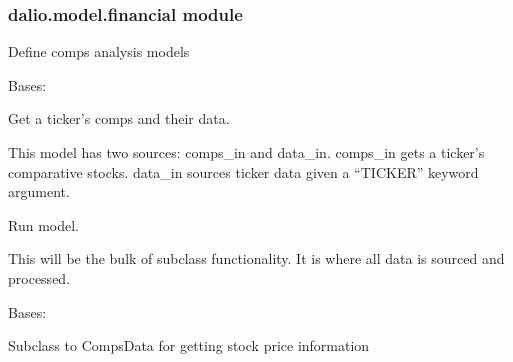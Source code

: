 \documentclass[letterpaper,10pt,english]{sphinxmanual}
\begin{document}
\subsubsection{dalio.model.financial module}
\label{\detokenize{dalio.model:module-dalio.model.financial}}\label{\detokenize{dalio.model:dalio-model-financial-module}}
Define comps analysis models

\begin{fulllineitems}
\label{\detokenize{dalio.model:dalio.model.financial.CompsData}}
Bases: {\hyperref[\detokenize{dalio.model:dalio.model.model.Model}]{}}

Get a ticker’s comps and their data.

This model has two sources: comps\_in and data\_in. comps\_in gets a
ticker’s comparative stocks. data\_in sources ticker data given a “TICKER”
keyword argument.

\begin{fulllineitems}
\label{\detokenize{dalio.model:dalio.model.financial.CompsData.run}}
Run model.

This will be the bulk of subclass functionality. It is where all
data is sourced and processed.

\end{fulllineitems}


\end{fulllineitems}


\begin{fulllineitems}
\label{\detokenize{dalio.model:dalio.model.financial.CompsFinancials}}
Bases: {\hyperref[\detokenize{dalio.model:dalio.model.financial.CompsData}]{}}

Subclass to CompsData for getting stock price information

\end{fulllineitems}
\end{document}
